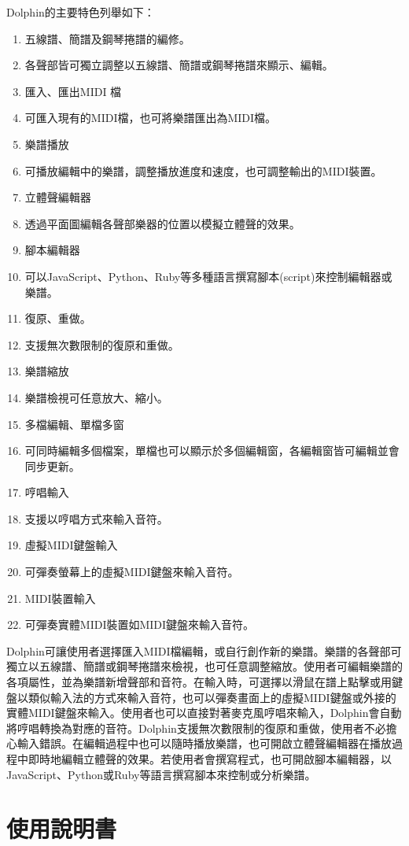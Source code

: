 \documentclass[12pt,a4paper,oneside]{report}
\begin{document}
Dolphin的主要特色列舉如下：
\begin{enumerate}
\item 五線譜、簡譜及鋼琴捲譜的編修。
\item 各聲部皆可獨立調整以五線譜、簡譜或鋼琴捲譜來顯示、編輯。
\item 匯入、匯出MIDI 檔
\item 可匯入現有的MIDI檔，也可將樂譜匯出為MIDI檔。
\item 樂譜播放
\item 可播放編輯中的樂譜，調整播放進度和速度，也可調整輸出的MIDI裝置。
\item 立體聲編輯器
\item 透過平面圖編輯各聲部樂器的位置以模擬立體聲的效果。
\item 腳本編輯器 
\item 可以JavaScript、Python、Ruby等多種語言撰寫腳本(script)來控制編輯器或樂譜。
\item 復原、重做。
\item 支援無次數限制的復原和重做。
\item 樂譜縮放
\item 樂譜檢視可任意放大、縮小。
\item 多檔編輯、單檔多窗
\item 可同時編輯多個檔案，單檔也可以顯示於多個編輯窗，各編輯窗皆可編輯並會同步更新。
\item 哼唱輸入
\item 支援以哼唱方式來輸入音符。
\item 虛擬MIDI鍵盤輸入
\item 可彈奏螢幕上的虛擬MIDI鍵盤來輸入音符。
\item MIDI裝置輸入
\item 可彈奏實體MIDI裝置如MIDI鍵盤來輸入音符。 
\end{enumerate}

Dolphin可讓使用者選擇匯入MIDI檔編輯，或自行創作新的樂譜。樂譜的各聲部可獨立以五線譜、簡譜或鋼琴捲譜來檢視，也可任意調整縮放。使用者可編輯樂譜的各項屬性，並為樂譜新增聲部和音符。在輸入時，可選擇以滑鼠在譜上點擊或用鍵盤以類似輸入法的方式來輸入音符，也可以彈奏畫面上的虛擬MIDI鍵盤或外接的實體MIDI鍵盤來輸入。使用者也可以直接對著麥克風哼唱來輸入，Dolphin會自動將哼唱轉換為對應的音符。Dolphin支援無次數限制的復原和重做，使用者不必擔心輸入錯誤。在編輯過程中也可以隨時播放樂譜，也可開啟立體聲編輯器在播放過程中即時地編輯立體聲的效果。若使用者會撰寫程式，也可開啟腳本編輯器，以JavaScript、Python或Ruby等語言撰寫腳本來控制或分析樂譜。

\chapter{使用說明書}
\end{document}

